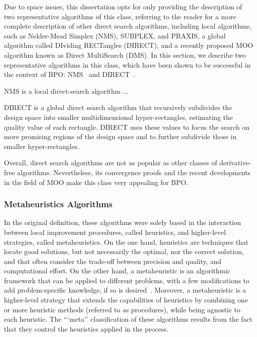 	Due to space issues, this dissertation opts for only providing the description of two representative algorithms of this class, referring  to the reader for a more complete description of other direct search algorithms, including local algorithms, such as Nelder-Mead Simplex (NMS), SUBPLEX, and PRAXIS, a global algorithm called DIviding RECTangles (DIRECT), and a recently proposed \ac{MOO} algorithm known as Direct MultiSearch (DMS). In this section, we describe two representative algorithms in this class, which have been shown to be successful in the context of \ac{BPO}: NMS~\cite{Nelder1964} and DIRECT~\cite{Jones1993DIRECT}. 
	
	NMS is a local direct-search algorithm ...
	
	DIRECT is a global direct search algorithm that recursively subdivides the design space into smaller multidimensional hyper-rectangles, estimating the quality value of each rectangle. DIRECT uses these values to focus the search on more promising regions of the design space and to further subdivide those in smaller hyper-rectangles. 
	
	Overall, direct search algorithms are not as popular as other classes of derivative-free algorithms. Nevertheless, its convergence proofs and the recent developments in the field of \ac{MOO} make this class very appealing for \ac{BPO}. 
	
	\subsubsection{Metaheuristics Algorithms}
	\label{ssec:metaheuristics}
	
	In the original definition, these algorithms were solely based in the interaction between local improvement procedures, called heuristics, and higher-level strategies, called metaheuristics. On the one hand, heuristics are techniques that locate good solutions, but not necessarily the optimal, nor the correct solution, and that often consider the trade-off between precision and quality, and computational effort. On the other hand, a metaheuristic is an algorithmic framework that can be applied to different problems, with a few modifications to add problem-specific knowledge, if so is desired~\cite{Glover2003Metaheuristics}. Moreover, a metaheuristic is a higher-level strategy that extends the capabilities of heuristics by combining one or more heuristic methods (referred to as procedures), while being agnostic to each heuristic. The ```meta'' classification of these algorithms results from the fact that they control the heuristics applied in the process.
	
